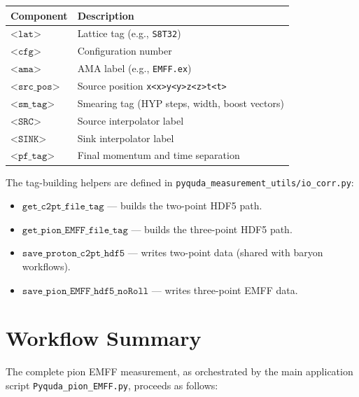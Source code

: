 \documentclass[11pt,a4paper]{article}
\begin{document}
\begin{center}
\begin{tabular}{ll}
\toprule
\textbf{Component} & \textbf{Description} \\
\midrule
\(\texttt{<lat>}\)        & Lattice tag (e.g., \texttt{S8T32}) \\
\(\texttt{<cfg>}\)        & Configuration number \\
\(\texttt{<ama>}\)        & AMA label (e.g., \texttt{EMFF.ex}) \\
\(\texttt{<src\_pos>}\)   & Source position
                          \texttt{x<x>y<y>z<z>t<t>} \\
\(\texttt{<sm\_tag>}\)     & Smearing tag (HYP steps, width,
                          boost vectors) \\
\(\texttt{<SRC>}\)        & Source interpolator label \\
\(\texttt{<SINK>}\)       & Sink interpolator label \\
\(\texttt{<pf\_tag>}\)     & Final momentum and time separation \\
\bottomrule
\end{tabular}
\end{center}

The tag-building helpers are defined in
\texttt{pyquda\_measurement\_utils/io\_corr.py}:
\begin{itemize}[nosep]
  \item \(\texttt{get\_c2pt\_file\_tag}\) --- builds the two-point HDF5 path.
  \item \(\texttt{get\_pion\_EMFF\_file\_tag}\) --- builds the three-point
        HDF5 path.
  \item \(\texttt{save\_proton\_c2pt\_hdf5}\) --- writes two-point data
        (shared with baryon workflows).
  \item \(\texttt{save\_pion\_EMFF\_hdf5\_noRoll}\) --- writes three-point
        EMFF data.
\end{itemize}


\section{Workflow Summary}

The complete pion EMFF measurement, as orchestrated by the main application
script \texttt{Pyquda\_pion\_EMFF.py}, proceeds as follows:
\end{document}
